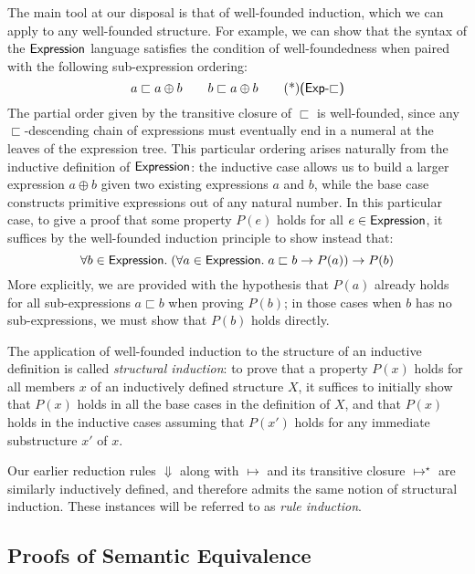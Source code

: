 \def\subExp{\sqsubset}

The main tool at our disposal is that of well-founded induction, which we
can apply to any well-founded structure. For example, we can show that the
syntax of the $\mathsf{Expression}$ language satisfies the condition of
well-foundedness when paired with the following sub-expression ordering:
\[
	a \subExp a \oplus b \qquad b \subExp a \oplus b \eqTag{Exp-$\subExp$}
\]
The partial order given by the transitive closure of $\subExp$ is
well-founded, since any $\subExp$-descending chain of expressions must
eventually end in a numeral at the leaves of the expression tree. This
particular ordering arises naturally from the inductive definition of
$\mathsf{Expression}$: the inductive case  allows us to build
a larger expression $a \oplus b$ given two existing expressions $a$ and $b$,
while the base case  constructs primitive
expressions out of any natural number. In this particular case, to give
a proof that some property $P(e)$ holds for all $e \in \mathsf{Expression}$, it
suffices by the well-founded induction principle to show instead that:
\[
	\forall b \in \Expression.\;
		(\forall a \in \Expression.\; a \subExp b \rightarrow P(a))
		\rightarrow P(b)
\]
More explicitly, we are provided with the hypothesis that $P(a)$ already
holds for all sub-expressions $a \subExp b$ when proving $P(b)$; in those
cases when $b$ has no sub-expressions, we must show that $P(b)$ holds
directly.

The application of well-founded induction to the structure of an inductive
definition is called \emph{structural induction}: to prove that a property
$P(x)$ holds for all members $x$ of an inductively defined structure $X$, it
suffices to initially show that $P(x)$ holds in all the base cases in the
definition of $X$, and that $P(x)$ holds in the inductive cases assuming
that $P(x')$ holds for any immediate substructure $x'$ of $x$.

Our earlier reduction rules ${\Downarrow}$ along with ${\mapsto}$ and its
transitive closure ${\mapsto^\star}$ are similarly inductively defined, and
therefore admits the same notion of structural induction. These instances
will be referred to as \emph{rule induction}.


\subsection{Proofs of Semantic Equivalence}%

